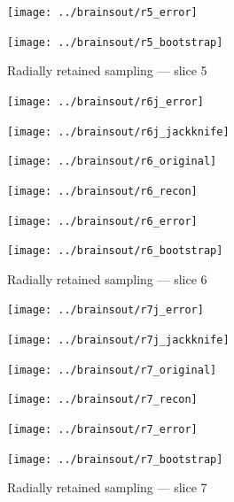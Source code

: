 \documentclass[article]{jdssv}
\begin{document}
\begin{appendix}
\begin{figure}
\begin{centering}
\vspace{\vertsep}

\parbox{\imsize}{\texttt{[image: ../brainsout/r5\_error]}}
\parbox{\imsize}{\texttt{[image: ../brainsout/r5\_bootstrap]}}

\end{centering}
\caption{Radially retained sampling --- slice 5}
\end{figure}


\begin{figure}
\begin{centering}

\parbox{\imsize}{\texttt{[image: ../brainsout/r6j\_error]}}
\parbox{\imsize}{\texttt{[image: ../brainsout/r6j\_jackknife]}}

\vspace{\vertsep}

\parbox{\imsize}{\texttt{[image: ../brainsout/r6\_original]}}
\parbox{\imsize}{\texttt{[image: ../brainsout/r6\_recon]}}

\vspace{\vertsep}

\parbox{\imsize}{\texttt{[image: ../brainsout/r6\_error]}}
\parbox{\imsize}{\texttt{[image: ../brainsout/r6\_bootstrap]}}

\end{centering}
\caption{Radially retained sampling --- slice 6}
\end{figure}


\begin{figure}
\begin{centering}

\parbox{\imsize}{\texttt{[image: ../brainsout/r7j\_error]}}
\parbox{\imsize}{\texttt{[image: ../brainsout/r7j\_jackknife]}}

\vspace{\vertsep}

\parbox{\imsize}{\texttt{[image: ../brainsout/r7\_original]}}
\parbox{\imsize}{\texttt{[image: ../brainsout/r7\_recon]}}

\vspace{\vertsep}

\parbox{\imsize}{\texttt{[image: ../brainsout/r7\_error]}}
\parbox{\imsize}{\texttt{[image: ../brainsout/r7\_bootstrap]}}

\end{centering}
\caption{Radially retained sampling --- slice 7}
\end{figure}


\begin{figure}
\begin{centering}


\end{centering}
\end{figure}
\end{appendix}
\end{document}
